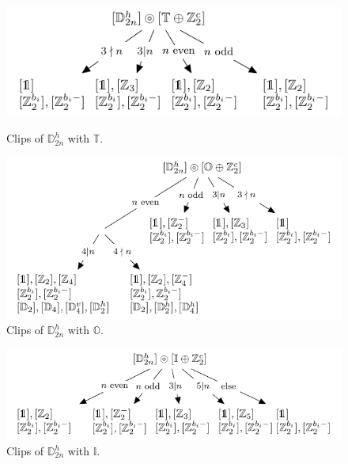 \documentclass[11pt,a4paper]{amsart}
\theoremstyle{definition}
\newcommand{\octa}{\mathbb{O}}              %
\newcommand{\ico}{\mathbb{I}}               %
\newcommand{\tetra}{\mathbb{T}}             %
\newcommand{\DD}{\mathbb{D}}                %
\newcommand{\1}{\mathds{1}}		            %
\begin{document}
\begin{figure}[h!]
	\begin{minipage}[b]{0.5\linewidth}
		\centering \includegraphics[width=0.9\linewidth]{"Figures piezo/graphe13'"}
		\caption{Clips of $\DD_{2n}^h$ with $\tetra$.}
		\label{fig:graphe13}
	\end{minipage}\hfill
	\begin{minipage}[b]{0.5\linewidth}
		\centering \includegraphics[width=0.9\linewidth]{"Figures piezo/graphe14'"}
		\caption{Clips of $\DD_{2n}^h$ with $\octa$.}
		\label{fig:graphe14}
	\end{minipage}
\end{figure}

\begin{figure}
		\centering \includegraphics[width=0.6\linewidth]{"Figures piezo/graphe15'"}
		\caption{Clips of $\DD_{2n}^h$ with $\ico$.}
		\label{fig:graphe15}
\end{figure}
\end{document}
